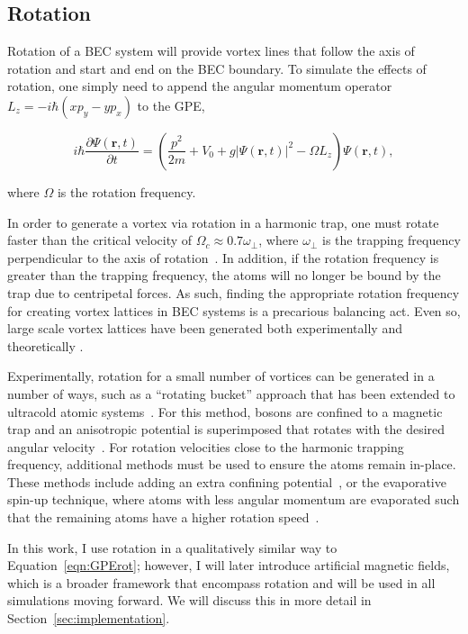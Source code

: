 \subsection{Rotation}

\label{sec:rot}
Rotation of a BEC system will provide vortex lines that follow the axis of rotation and start and end on the BEC boundary.
To simulate the effects of rotation, one simply need to append the angular momentum operator $L_z = -i\hbar(xp_y - yp_x)$ to the GPE,

\begin{equation}
i \hbar \frac{\partial \Psi(\mathbf{r},t)}{\partial t} = \left(\frac{p^2}{2m} + V_0 + g |\Psi(\mathbf{r},t)|^2 -\Omega L_z \right)\Psi(\mathbf{r},t),
\label{eqn:GPErot}
\end{equation}

\noindent where $\Omega$ is the rotation frequency. 

In order to generate a vortex via rotation in a harmonic trap, one must rotate faster than the critical velocity of $\Omega_c \approx 0.7 \omega_\perp$, where $\omega_\perp$ is the trapping frequency perpendicular to the axis of rotation~\cite{fetter2009}.
In addition, if the rotation frequency is greater than the trapping frequency, the atoms will no longer be bound by the trap due to centripetal forces.
As such, finding the appropriate rotation frequency for creating vortex lattices in BEC systems is a precarious balancing act.
Even so, large scale vortex lattices have been generated both experimentally and theoretically \cite{o2016, o2016topo, abo2001, schweikhard2004}.

Experimentally, rotation for a small number of vortices can be generated in a number of ways, such as a ``rotating bucket'' approach that has been extended to ultracold atomic systems~\cite{chevy2006}.
For this method, bosons are confined to a magnetic trap and an anisotropic potential is superimposed that rotates with the desired angular velocity~\cite{madison2000,abo2001,hodby2001,haljan2001}.
For rotation velocities close to the harmonic trapping frequency, additional methods must be used to ensure the atoms remain in-place.
These methods include adding an extra confining potential~\cite{bretin2004}, or the evaporative spin-up technique, where atoms with less angular momentum are evaporated such that the remaining atoms have a higher rotation speed~\cite{schweikhard2004,engels2003}.


In this work, I use rotation in a qualitatively similar way to Equation~\eqref{eqn:GPErot}; however, I will later introduce artificial magnetic fields, which is a broader framework that encompass rotation and will be used in all simulations moving forward.
We will discuss this in more detail in Section~\ref{sec:implementation}.

